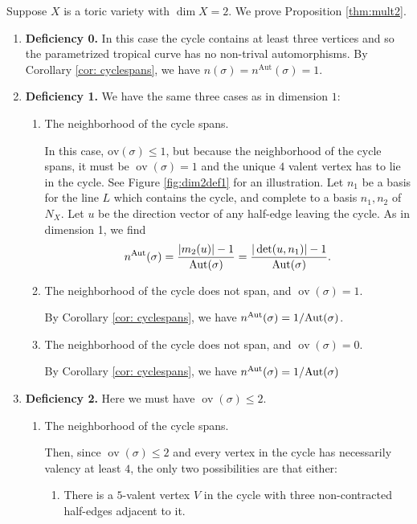 \documentclass{article}
\def\Aut{{\rm Aut}}
\newcommand{\ov}[1]{\operatorname{ov}(#1)}
\newcommand{\nn}{n^{\operatorname{Aut}}}
\begin{document}
Suppose $X$ is a toric variety with $\dim X = 2$. We prove Proposition \ref{thm:mult2}.

\begin{enumerate}
    \item \textbf{Deficiency 0.} In this case the cycle contains at least three vertices and so the parametrized tropical curve has no non-trival automorphisms. By Corollary \ref{cor: cyclespans}, we have $n(\sigma) = \nn(\sigma) = 1$. 

\item \textbf{Deficiency 1.} We have the same three cases as in dimension $1$: 
\begin{enumerate}
    \item The neighborhood of the cycle spans. 

    In this case, $\mathrm{ov}(\sigma) \leq 1$, but because the neighborhood of the cycle spans, it must be $\ov{\sigma}=1$ and the unique $4$ valent vertex has to lie in the cycle. See Figure \ref{fig:dim2def1} for an illustration. Let $n_1$ be a basis for the line $L$ which contains the cycle, and complete to a basis $n_1, n_2$ of $N_X$. Let $u$ be the direction vector of any half-edge leaving the cycle. As in dimension 1, we find $$
    \nn(\sigma) = \frac{|m_2(u)|-1}{\Aut(\sigma)}= \frac{|\det(u, n_1)|-1}{\Aut(\sigma)}.
    $$
    
    \item The neighborhood of the cycle does not span, and $\ov{\sigma} = 1$.

    By Corollary \ref{cor: cyclespans}, we have $\nn(\sigma) = 1/\Aut(\sigma)$.
    
    \item The neighborhood of the cycle does not span, and $\ov{\sigma} = 0$.

    By Corollary \ref{cor: cyclespans}, we have $\nn(\sigma) = 1/\Aut(\sigma)$
\end{enumerate}
    


\item \textbf{Deficiency 2.} Here we must have $\ov{\sigma}\leq 2$. 
\begin{enumerate}
    \item The neighborhood of the cycle spans.


    Then, since $\ov{\sigma} \leq 2$ and every vertex in the cycle has necessarily valency at least $4$, the only two possibilities are that either:
\begin{enumerate}[label=(\roman*)]
    \item There is a $5$-valent vertex $V$ in the cycle with three non-contracted half-edges adjacent to it.


\end{enumerate}
\end{enumerate}
\end{enumerate}
\end{document}
